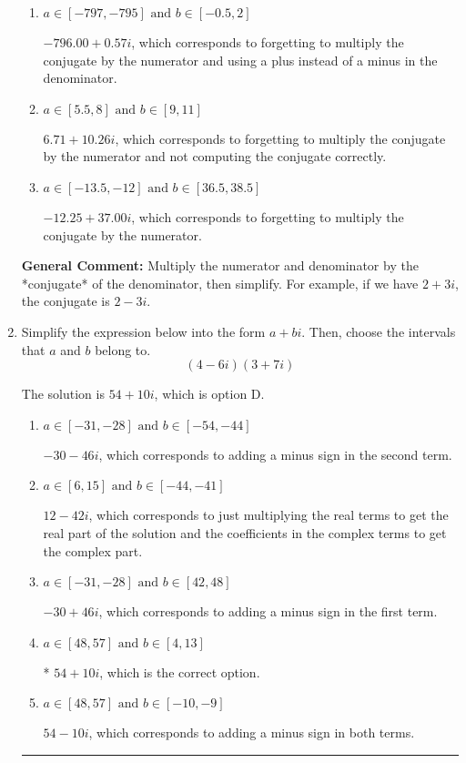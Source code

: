 \documentclass{extbook}[14pt]
\newcommand{\litem}[1]{\item #1

\rule{\textwidth}{0.4pt}}
\begin{document}
\begin{enumerate}
{\begin{enumerate}[label=\Alph*.]
* $-12.25  + 0.57 i$, which is the correct option.
\item \( a \in [-797, -795] \text{ and } b \in [-0.5, 2] \)

 $-796.00  + 0.57 i$, which corresponds to forgetting to multiply the conjugate by the numerator and using a plus instead of a minus in the denominator.
\item \( a \in [5.5, 8] \text{ and } b \in [9, 11] \)

 $6.71  + 10.26 i$, which corresponds to forgetting to multiply the conjugate by the numerator and not computing the conjugate correctly.
\item \( a \in [-13.5, -12] \text{ and } b \in [36.5, 38.5] \)

 $-12.25  + 37.00 i$, which corresponds to forgetting to multiply the conjugate by the numerator.
\end{enumerate}

\textbf{General Comment:} Multiply the numerator and denominator by the *conjugate* of the denominator, then simplify. For example, if we have $2+3i$, the conjugate is $2-3i$.
}
\litem{
Simplify the expression below into the form $a+bi$. Then, choose the intervals that $a$ and $b$ belong to.
\[ (4 - 6 i)(3 + 7 i) \]

The solution is \( 54 + 10 i \), which is option D.\begin{enumerate}[label=\Alph*.]
\item \( a \in [-31, -28] \text{ and } b \in [-54, -44] \)

 $-30 - 46 i$, which corresponds to adding a minus sign in the second term.
\item \( a \in [6, 15] \text{ and } b \in [-44, -41] \)

 $12 - 42 i$, which corresponds to just multiplying the real terms to get the real part of the solution and the coefficients in the complex terms to get the complex part.
\item \( a \in [-31, -28] \text{ and } b \in [42, 48] \)

 $-30 + 46 i$, which corresponds to adding a minus sign in the first term.
\item \( a \in [48, 57] \text{ and } b \in [4, 13] \)

* $54 + 10 i$, which is the correct option.
\item \( a \in [48, 57] \text{ and } b \in [-10, -9] \)

 $54 - 10 i$, which corresponds to adding a minus sign in both terms.
\end{enumerate}

}
\end{enumerate}
\end{document}
